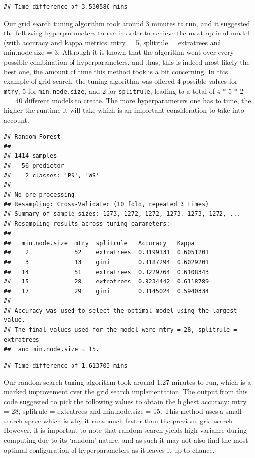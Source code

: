 \documentclass[12pt]{article}
\begin{document}
\begin{verbatim}
## Time difference of 3.530586 mins
\end{verbatim}

Our grid search tuning algorithm took around 3 minutes to run, and it
suggested the following hyperparameters to use in order to achieve the
most optimal model (with accuracy and kappa metrics: mtry = 5, splitrule
= extratrees and min.node.size = 3. Although it is known that the
algorithm went over every possible combination of hyperparameters, and
thus, this is indeed most likely the best one, the amount of time this
method took is a bit concerning. In this example of grid search, the
tuning algorithm was offered 4 possible values for \texttt{mtry}, 5 for
\texttt{min.node.size}, and 2 for \texttt{splitrule}, leading to a total
of 4 \(*\) 5 \(*\) 2 \(=\) 40 different models to create. The more
hyperparameters one has to tune, the higher the runtime it will take
which is an important consideration to take into account.

\begin{verbatim}
## Random Forest 
## 
## 1414 samples
##   56 predictor
##    2 classes: 'PS', 'WS' 
## 
## No pre-processing
## Resampling: Cross-Validated (10 fold, repeated 3 times) 
## Summary of sample sizes: 1273, 1272, 1272, 1273, 1273, 1272, ... 
## Resampling results across tuning parameters:
## 
##   min.node.size  mtry  splitrule   Accuracy   Kappa    
##    2             52    extratrees  0.8199131  0.6051201
##    3             13    gini        0.8187294  0.6029201
##   14             51    extratrees  0.8229764  0.6108343
##   15             28    extratrees  0.8234442  0.6118789
##   17             29    gini        0.8145024  0.5940334
## 
## Accuracy was used to select the optimal model using the largest value.
## The final values used for the model were mtry = 28, splitrule = extratrees
##  and min.node.size = 15.
\end{verbatim}

\begin{verbatim}
## Time difference of 1.613703 mins
\end{verbatim}

Our random search tuning algorithm took around 1.27 minutes to run,
which is a marked improvement over the grid search implementation. The
output from this code suggested to pick the following values to obtain
the highest accuracy: mtry = 28, splitrule = extratrees and
min.node.size = 15. This method uses a small search space which is why
it runs much faster than the previous grid search. However, it is
important to note that random search yields high variance during
computing due to its `random' nature, and as such it may not also find
the most optimal configuration of hyperparameters as it leaves it up to
chance.
\end{document}
